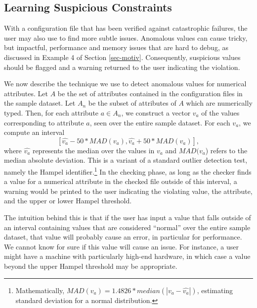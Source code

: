 \subsection{Learning Suspicious Constraints}
\label{subsec-constraints}
With a configuration file that has been verified against catastrophic failures, the user may also use \app to find more subtle issues. Anomalous values can cause tricky, but impactful, performance and memory issues that are hard to debug, as discussed in Example 4 of Section \ref{sec-motiv}. 
Consequently, suspicious values should be flagged and a warning returned to the user indicating the violation.

We now describe the technique we use to detect anomalous values for 
numerical attributes. Let $A$ be the set of attributes contained in the 
configuration files in the sample dataset. 
Let $A_n$ be the subset of attributes of $A$ which are numerically typed. 
Then, for each attribute $a \in A_n$, we construct a vector $v_a$ of the 
values corresponding to attribute $a$, seen over the entire sample dataset.
For each $v_a$, we compute 
an interval  $$[\hat{v_a} - 50*MAD(v_a), \hat{v_a} + 50*MAD(v_a)],$$ 
where $\hat{v_a}$ represents the median over the values 
in $v_a$ and $MAD(v_a$) refers to the 
median absolute deviation. 
This is a variant of a standard outlier detection test, namely the Hampel identifier.\footnote{Mathematically, $MAD(v_a) = 1.4826* median(|v_a - \hat{v_a}|)$, estimating standard deviation 
for a normal distribution.} 
In the checking phase, as long as the checker finds a value for a numerical 
attribute in the checked file outside of this interval, 
a warning would be printed to the user indicating the violating value, 
the attribute, and the upper or lower Hampel threshold. 

The intuition behind this is that if the user has input a value 
that falls outside of an interval containing values that are considered 
``normal'' over the entire sample dataset, 
that value will probably cause an error, in particular for performance. 
We cannot know for sure if this value will cause an issue. 
For instance, a user might have a machine with 
particularly high-end hardware, 
in which case a value beyond the upper Hampel threshold may be appropriate. 
